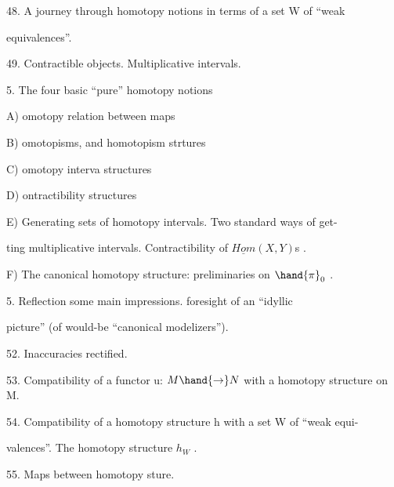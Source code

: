 \par
48. \deleted{(}A journey through  homotopy notions\hand{,} \unsure{\deleted{(}}in terms of a set W of ``weak\par
equivalences''\deleted{)}.\par

49.  Contractible objects.  Multiplicative intervals.\par

\hand{(}5.\hand{)} The four basic ``pure'' homotopy notions   \par
{}\par

A) omotopy relation between maps\par

B) omotopisms, and homotopism strtures\par

C) omotopy interva structures\par

D) ontractibility structures\par

E) Generating sets of homotopy intervals. Two standard ways of get-\par%
ting multiplicative intervals. Contractibility of $\underline{Hom}(X,Y)$s .\par

F) The canonical homotopy structure: preliminaries on $\hand{\pi}_{0}$ .\par

\hand{(}5.\hand{)} Reflection  some main impressions.  foresight of an ``idyllic\par
picture'' (of would-be ``canonical modelizers'').\par

52.  Inaccuracies rectified.\par

53.  Compatibility of a functor u: $M\hand{\rightarrow}N$ with a homotopy structure on M.\par

54.  Compatibility of a homotopy structure h with a set W of ``weak equi-\par%
valences''.  The homotopy structure $h_{W}$ .\par

55.  Maps between homotopy sture.\par


